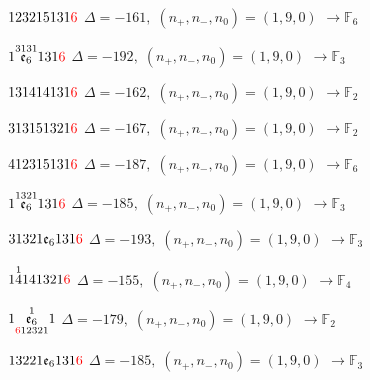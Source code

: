 \documentclass[10pt]{article}
\begin{document}
$123215131\textcolor{red}{6}$ \quad $\Delta=-161,\; (n_+,n_-,n_0)=(1,9,0)$ \quad $\to \mathbb{F}_{6}$

\smallskip

$1\overset{3131}{\mathfrak{e}_6}131\textcolor{red}{6}$ \quad $\Delta=-192,\; (n_+,n_-,n_0)=(1,9,0)$ \quad $\to \mathbb{F}_{3}$

\smallskip

$131414131\textcolor{red}{6}$ \quad $\Delta=-162,\; (n_+,n_-,n_0)=(1,9,0)$ \quad $\to \mathbb{F}_{2}$

\smallskip

$313151321\textcolor{red}{6}$ \quad $\Delta=-167,\; (n_+,n_-,n_0)=(1,9,0)$ \quad $\to \mathbb{F}_{2}$

\smallskip

$412315131\textcolor{red}{6}$ \quad $\Delta=-187,\; (n_+,n_-,n_0)=(1,9,0)$ \quad $\to \mathbb{F}_{6}$

\smallskip

$1\overset{1321}{\mathfrak{e}_6}131\textcolor{red}{6}$ \quad $\Delta=-185,\; (n_+,n_-,n_0)=(1,9,0)$ \quad $\to \mathbb{F}_{3}$

\smallskip

$31321\mathfrak{e}_6131\textcolor{red}{6}$ \quad $\Delta=-193,\; (n_+,n_-,n_0)=(1,9,0)$ \quad $\to \mathbb{F}_{3}$

\smallskip

$1\overset{1}{4}141321\textcolor{red}{6}$ \quad $\Delta=-155,\; (n_+,n_-,n_0)=(1,9,0)$ \quad $\to \mathbb{F}_{4}$

\smallskip

$1\overset{1}{\underset{\textcolor{red}{6}12321}{\mathfrak{e}_6}}1$ \quad $\Delta=-179,\; (n_+,n_-,n_0)=(1,9,0)$ \quad $\to \mathbb{F}_{2}$

\smallskip

$13221\mathfrak{e}_6131\textcolor{red}{6}$ \quad $\Delta=-185,\; (n_+,n_-,n_0)=(1,9,0)$ \quad $\to \mathbb{F}_{3}$

\smallskip
\end{document}
